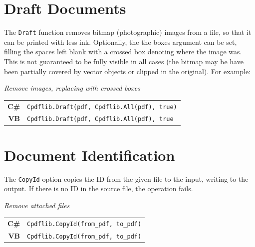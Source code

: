 \documentclass[a4paper]{memoir}
\begin{document}
\section{Draft Documents}
    The \verb!Draft! function removes bitmap (photographic) images from a
file, so that it can be printed with less ink. Optionally, the the
boxes argument can be set, filling the spaces left blank with a
crossed box denoting where the image was. This is not guaranteed to be fully
visible in all cases (the bitmap may be have been partially covered by vector
objects or clipped in the original). For example:
\begin{framed}
\noindent\textit{Remove images, replacing with crossed boxes}

\vspace{2mm}
\noindent\begin{tabular}{rl}
\small\sffamily\textbf{C\#} &
\begin{minipage}{4in}
\small\verb!Cpdflib.Draft(pdf, Cpdflib.All(pdf), true)!
\end{minipage}\\[5mm]
\small\sffamily\textbf{VB} &
\begin{minipage}{4in}
\small\verb!Cpdflib.Draft(pdf, Cpdflib.All(pdf), true!
\end{minipage}\\[5mm]
\end{tabular}
\end{framed}

\section{Document Identification}
  The \verb!CopyId! option copies the ID from the given file to the
input, writing to the output.
  If there is no ID in the source file, the operation fails.

\begin{framed}
\noindent\textit{Remove attached files}

\vspace{2mm}
\noindent\begin{tabular}{rl}
\small\sffamily\textbf{C\#} &
\begin{minipage}{4in}
\small\verb!Cpdflib.CopyId(from_pdf, to_pdf)!
\end{minipage}\\[5mm]
\small\sffamily\textbf{VB} &
\begin{minipage}{4in}
\small\verb!Cpdflib.CopyId(from_pdf, to_pdf)!
\end{minipage}\\[5mm]
\end{tabular}
\end{framed}
\end{document}
